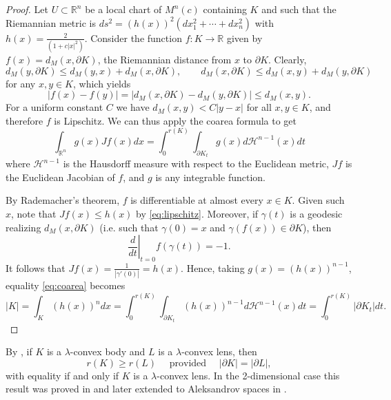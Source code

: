 \documentclass[12pt]{amsart}
\newcommand{\R}{\mathbb{R}}
\renewcommand{\ge}{\geqslant}
\theoremstyle{theorem}
\theoremstyle{Intro}
\theoremstyle{definition}
\theoremstyle{remark}
\theoremstyle{claim}
\numberwithin{equation}{section}
\begin{document}
\begin{proof}
    Let $U\subset \mathbb R^n$ be a local chart of $M^n(c)$ containing $K$ and such that the Riemannian metric is $ds^2=(h(x))^2(dx_1^2+\cdots+dx_n^2)$ with $h(x)=\frac2{(1+c|x|^2)}$. 
    Consider the function $f\colon K\to \R$ given by $f(x)=d_M(x,\partial K)$, the Riemannian distance from $x$ to $\partial K$. Clearly,
    \[
    d_M(y,\partial K)\leq d_M(y,x)+ d_M(x,\partial K),\qquad d_M(x,\partial K)\leq d_M(x,y)+ d_M(y,\partial K)
    \]
    for any $x,y\in K$, which yields 
    \begin{equation}\label{eq:lipschitz}
     |f(x)-f(y)|=|d_M(x,\partial K)-d_M(y,\partial K)|\leq d_M(x,y).   
    \end{equation}
    For a uniform constant $C$ we have $d_M(x,y)<C|y-x|$ for all $x,y\in K$, and therefore $f$ is Lipschitz. We can thus apply the coarea formula \cite[3.2.12]{federer} to get
    \begin{equation}\label{eq:coarea}
    \int_{\R^n}g(x) Jf(x) dx=\int_0^{r(K)}\int_{\partial K_t} g(x) d\mathcal H^{n-1}(x) dt
    \end{equation}
    where $\mathcal H^{n-1}$ is the Hausdorff measure with respect to the Euclidean metric, $Jf$ is the Euclidean Jacobian of $f$, and $g$ is any integrable function.
    
    By Rademacher's theorem, $f$ is differentiable at almost every $x\in K$. Given such $x$, note that $Jf(x)\leq h(x)$ by \eqref{eq:lipschitz}. Moreover, if $\gamma(t)$ is a geodesic realizing $d_M(x,\partial K)$ (i.e. such that $\gamma(0)=x$  and  $\gamma(f(x))\in\partial K$), then
    \[
    \left. \frac{d}{dt} \right|_{t=0} f(\gamma(t))=-1.
    \]
It follows that $Jf(x)=\frac1{|\gamma'(0)|}=h(x)$. Hence, taking  $g(x)=(h(x))^{n-1}$, equality \eqref{eq:coarea} becomes
\[
|K|=\int_K \left(h(x)\right)^n dx=\int_0^{r(K)}\int_{\partial K_t} \left(h(x)\right)^{n-1} d\mathcal H^{n-1}(x) dt=\int_0^{r(K)} |\partial K_t|dt.
\]    
\end{proof}



 By \cite[Theorem B]{DT}, if $K$ is a $\lambda$-convex body and $L$ is a $\lambda$-convex lens, then 
\begin{equation}
    \label{Eq:Inrad}
    r(K) \ge r(L) \quad \text{ provided }\quad |\partial K| = |\partial L|,
\end{equation}
with equality if and only if $K$ is a $\lambda$-convex lens.  In the 2-dimensional case this result was proved in  \cite{MilInradius} and later extended to Aleksandrov spaces in  \cite{Dr}.
\end{document}
